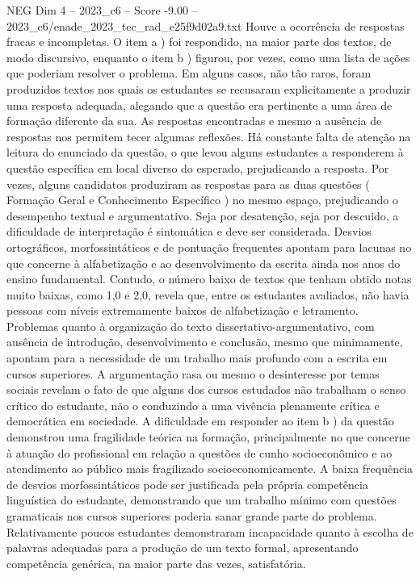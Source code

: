 \begin{textsample}{NEG Dim 4 – 2023\_c6 – Score -9.00 – 2023\_c6/enade\_2023\_tec\_rad\_e25f9d02a9.txt}
Houve a ocorrência de respostas fracas e incompletas.
O item a ) foi respondido, na maior parte dos textos, de modo discursivo, enquanto o item b ) figurou, por vezes, como uma lista de ações que poderiam resolver o problema.
Em alguns casos, não tão raros, foram produzidos textos nos quais os estudantes se recusaram explicitamente a produzir uma resposta adequada, alegando que a questão era pertinente a uma área de formação diferente da sua.
As respostas encontradas e mesmo a ausência de respostas nos permitem tecer algumas reflexões.
Há constante falta de atenção na leitura do enunciado da questão, o que levou alguns estudantes a responderem à questão específica em local diverso do esperado, prejudicando a resposta.
Por vezes, alguns candidatos produziram as respostas para as duas questões ( Formação Geral e Conhecimento Específico ) no mesmo espaço, prejudicando o desempenho textual e argumentativo.
Seja por desatenção, seja por descuido, a dificuldade de interpretação é sintomática e deve ser considerada.
Desvios ortográficos, morfossintáticos e de pontuação frequentes apontam para lacunas no que concerne à alfabetização e ao desenvolvimento da escrita ainda nos anos do ensino fundamental.
Contudo, o número baixo de textos que tenham obtido notas muito baixas, como 1,0 e 2,0, revela que, entre os estudantes avaliados, não havia pessoas com níveis extremamente baixos de alfabetização e letramento.
Problemas quanto à organização do texto dissertativo-argumentativo, com ausência de introdução, desenvolvimento e conclusão, mesmo que minimamente, apontam para a necessidade de um trabalho mais profundo com a escrita em cursos superiores.
A argumentação rasa ou mesmo o desinteresse por temas sociais revelam o fato de que alguns dos cursos estudados não trabalham o senso crítico do estudante, não o conduzindo a uma vivência plenamente crítica e democrática em sociedade.
A dificuldade em responder ao item b ) da questão demonstrou uma fragilidade teórica na formação, principalmente no que concerne à atuação do profissional em relação a questões de cunho socioeconômico e ao atendimento ao público mais fragilizado socioeconomicamente.
A baixa frequência de desvios morfossintáticos pode ser justificada pela própria competência linguística do estudante, demonstrando que um trabalho mínimo com questões gramaticais nos cursos superiores poderia sanar grande parte do problema.
Relativamente poucos estudantes demonstraram incapacidade quanto à escolha de palavras adequadas para a produção de um texto formal, apresentando competência genérica, na maior parte das vezes, satisfatória.

\end{textsample}
